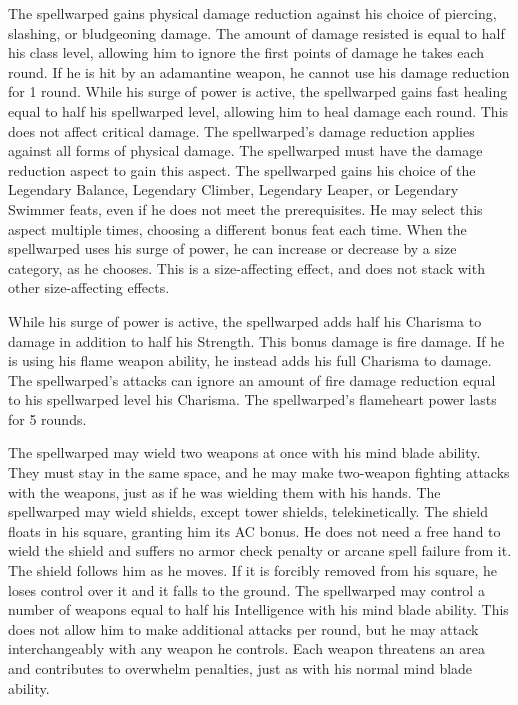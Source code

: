  The spellwarped gains physical damage reduction against his choice of piercing, slashing, or bludgeoning damage. The amount of damage resisted is equal to half his class level, allowing him to ignore the first points of damage he takes each round. If he is hit by an adamantine weapon, he cannot use his damage reduction for 1 round.
 While his surge of power is active, the spellwarped gains fast healing equal to half his spellwarped level, allowing him to heal damage each round. This does not affect critical damage.
 The spellwarped's damage reduction applies against all forms of physical damage. The spellwarped must have the damage reduction aspect to gain this aspect.
 The spellwarped gains his choice of the Legendary Balance, Legendary Climber, Legendary Leaper, or Legendary Swimmer feats, even if he does not meet the prerequisites. He may select this aspect multiple times, choosing a different bonus feat each time.
 When the spellwarped uses his surge of power, he can increase or decrease by a size category, as he chooses. This is a size-affecting effect, and does not stack with other size-affecting effects.

 While his surge of power is active, the spellwarped adds half his Charisma to damage in addition to half his Strength. This bonus damage is fire damage. If he is using his flame weapon ability, he instead adds his full Charisma to damage.
 The spellwarped's attacks can ignore an amount of fire damage reduction equal to his spellwarped level \add his Charisma.
 The spellwarped's flameheart power lasts for 5 rounds.

 The spellwarped may wield two weapons at once with his mind blade ability. They must stay in the same space, and he may make two-weapon fighting attacks with the weapons, just as if he was wielding them with his hands.
 The spellwarped may wield shields, except tower shields, telekinetically. The shield floats in his square, granting him its AC bonus. He does not need a free hand to wield the shield and suffers no armor check penalty or arcane spell failure from it. The shield follows him as he moves. If it is forcibly removed from his square, he loses control over it and it falls to the ground.
 The spellwarped may control a number of weapons equal to half his Intelligence with his mind blade ability. This does not allow him to make additional attacks per round, but he may attack interchangeably with any weapon he controls. Each weapon threatens an area and contributes to overwhelm penalties, just as with his normal mind blade ability.

